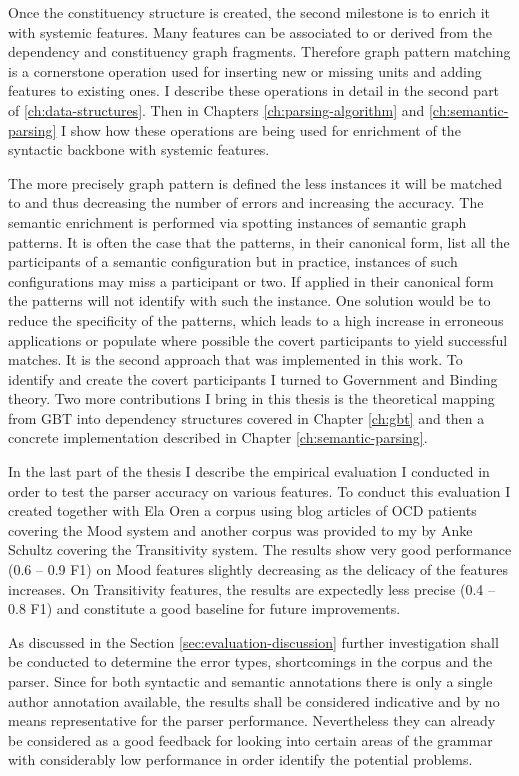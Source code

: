 Once the constituency structure is created, the second milestone is to enrich it with systemic features. Many features can be associated to or derived from the dependency and constituency graph fragments. Therefore graph pattern matching is a cornerstone operation used for inserting new or missing units and adding features to existing ones. I describe these operations in detail in the second part of \ref{ch:data-structures}. Then in Chapters \ref{ch:parsing-algorithm} and \ref{ch:semantic-parsing} I show how these operations are being used for enrichment of the syntactic backbone with systemic features.

The more precisely graph pattern is defined the less instances it will be matched to and thus decreasing the number of errors and increasing the accuracy. The semantic enrichment is performed via spotting instances of semantic graph patterns. It is often the case that the patterns, in their canonical form, list all the participants of a semantic configuration but in practice, instances of such configurations may miss a participant or two. If applied in their canonical form the patterns will not identify with such the instance. One solution would be to reduce the specificity of the patterns, which leads to a high increase in erroneous applications or populate where possible the covert participants to yield successful matches. It is the second approach that was implemented in this work. To identify and create the covert participants I turned to Government and Binding theory. Two more contributions I bring in this thesis is the theoretical mapping from GBT into dependency structures covered in Chapter \ref{ch:gbt} and then a concrete implementation described in Chapter \ref{ch:semantic-parsing}.

In the last part of the thesis I describe the empirical evaluation I conducted in order to test the parser accuracy on various features. To conduct this evaluation I created together with Ela Oren a corpus using blog articles of OCD patients covering the Mood system and another corpus was provided to my by Anke Schultz covering the Transitivity system. The results show very good performance (0.6 -- 0.9 F1) on Mood features slightly decreasing as the delicacy of the features increases. On Transitivity features, the results are expectedly less precise (0.4 -- 0.8 F1) and constitute a good baseline for future improvements. 

As discussed in the Section \ref{sec:evaluation-discussion} further investigation shall be conducted to determine the error types, shortcomings in the corpus and the parser. Since for both syntactic and semantic annotations there is only a single author annotation available, the results shall be considered indicative and by no means representative for the parser performance. Nevertheless they can already be considered as a good feedback for looking into certain areas of the grammar with considerably low performance in order identify the potential problems.

